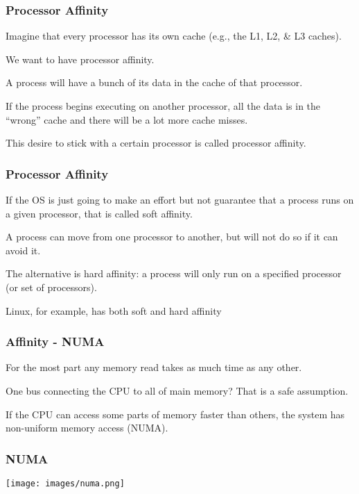 \begin{frame}
\frametitle{Processor Affinity}

Imagine that every processor has its own cache (e.g., the L1, L2, \& L3 caches).

We want to have \alert{processor affinity}. 

A process will have a bunch of its data in the cache of that processor. 

If the process begins executing on another processor, all the data is in the ``wrong'' cache and there will be a lot more cache misses. 

This desire to stick with a certain processor is called processor affinity.


\end{frame}

\begin{frame}
\frametitle{Processor Affinity}

If the OS is just going to make an effort but not guarantee that a process runs on a given processor, that is called \alert{soft affinity}. 

A process can move from one processor to another, but will not do so if it can avoid it. 

The alternative is \alert{hard affinity}: a process will only run on a specified processor (or set of processors). 

Linux, for example, has both soft and hard affinity

\end{frame}

\begin{frame}
\frametitle{Affinity - NUMA}

For the most part any memory read takes as much time as any other. 

One bus connecting the CPU to all of main memory? That is a safe assumption.

  If the CPU can access some parts of memory faster than others, the system has \alert{non-uniform memory access} (NUMA).

\end{frame}

\begin{frame}
\frametitle{NUMA}

\begin{center}
	\texttt{[image: images/numa.png]}
\end{center}

\end{frame}

